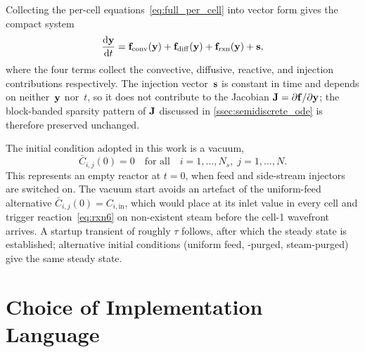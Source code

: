 Collecting the per-cell equations~\eqref{eq:full_per_cell} into vector form gives the compact system
%
\begin{equation}
  \frac{\mathrm{d}\mathbf{y}}{\mathrm{d}t}
  = \mathbf{f}_{\mathrm{conv}}(\mathbf{y})
  + \mathbf{f}_{\mathrm{diff}}(\mathbf{y})
  + \mathbf{f}_{\mathrm{rxn}}(\mathbf{y})
  + \mathbf{s},
  \label{eq:ode_split}
\end{equation}
%
where the four terms collect the convective, diffusive, reactive, and injection contributions respectively. The injection vector~\(\mathbf{s}\) is constant in time and depends on neither~\(\mathbf{y}\) nor~\(t\), so it does not contribute to the Jacobian \(\mathbf{J} = \partial \mathbf{f}/\partial \mathbf{y}\); the block-banded sparsity pattern of \(\mathbf{J}\) discussed in \cref{ssec:semidiscrete_ode} is therefore preserved unchanged.

The initial condition adopted in this work is a vacuum,
%
\begin{equation}
  \bar{C}_{i,j}(0) = 0
  \quad\text{for all}\quad i = 1, \ldots, N_s,\; j = 1, \ldots, N.
  \label{eq:ic_vacuum}
\end{equation}
%
This represents an empty reactor at \(t = 0\), when feed and side-stream injectors are switched on. The vacuum start avoids an artefact of the uniform-feed alternative \(\bar{C}_{i,j}(0) = C_{i,\mathrm{in}}\), which would place  at its inlet value in every cell and trigger reaction~\eqref{eq:rxn6} on non-existent steam before the cell-1 wavefront arrives. A startup transient of roughly \(\tau\) follows, after which the steady state is established; alternative initial conditions (uniform feed, -purged, steam-purged) give the same steady state.

\section{Choice of Implementation Language}\label{sec:fortran}

